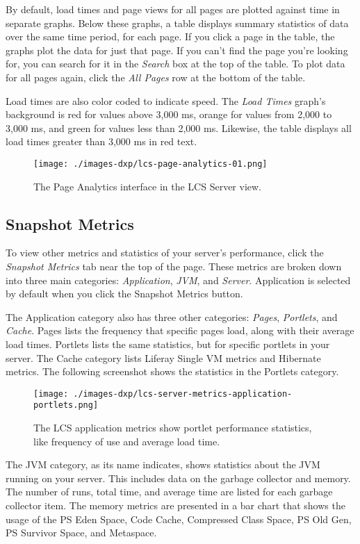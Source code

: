 By default, load times and page views for all pages are plotted against
time in separate graphs. Below these graphs, a table displays summary
statistics of data over the same time period, for each page. If you
click a page in the table, the graphs plot the data for just that page.
If you can't find the page you're looking for, you can search for it in
the \emph{Search} box at the top of the table. To plot data for all
pages again, click the \emph{All Pages} row at the bottom of the table.

Load times are also color coded to indicate speed. The \emph{Load Times}
graph's background is red for values above 3,000 ms, orange for values
from 2,000 to 3,000 ms, and green for values less than 2,000 ms.
Likewise, the table displays all load times greater than 3,000 ms in red
text.

\begin{figure}
\centering
\texttt{[image: ./images-dxp/lcs-page-analytics-01.png]}
\caption{The Page Analytics interface in the LCS Server view.}
\end{figure}

\subsection{Snapshot Metrics}\label{snapshot-metrics}

To view other metrics and statistics of your server's performance, click
the \emph{Snapshot Metrics} tab near the top of the page. These metrics
are broken down into three main categories: \emph{Application},
\emph{JVM}, and \emph{Server}. Application is selected by default when
you click the Snapshot Metrics button.

The Application category also has three other categories: \emph{Pages},
\emph{Portlets}, and \emph{Cache}. Pages lists the frequency that
specific pages load, along with their average load times. Portlets lists
the same statistics, but for specific portlets in your server. The Cache
category lists Liferay Single VM metrics and Hibernate metrics. The
following screenshot shows the statistics in the Portlets category.

\begin{figure}
\centering
\texttt{[image: ./images-dxp/lcs-server-metrics-application-portlets.png]}
\caption{The LCS application metrics show portlet performance
statistics, like frequency of use and average load time.}
\end{figure}

The JVM category, as its name indicates, shows statistics about the JVM
running on your server. This includes data on the garbage collector and
memory. The number of runs, total time, and average time are listed for
each garbage collector item. The memory metrics are presented in a bar
chart that shows the usage of the PS Eden Space, Code Cache, Compressed
Class Space, PS Old Gen, PS Survivor Space, and Metaspace.

